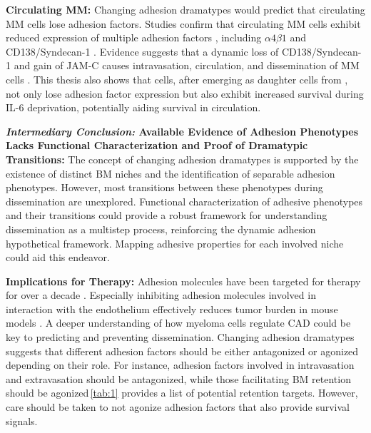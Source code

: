 \textbf{Circulating MM:}
Changing adhesion dramatypes would predict that circulating MM cells lose adhesion
factors. Studies confirm that  circulating
\ac{MM} cells exhibit reduced expression of multiple adhesion factors
, including
$\alpha4\beta1$ and CD138/Syndecan-1
\cite{paivaDetailedCharacterizationMultiple2013,
      paivaCompetitionClonalPlasma2011, akhmetzyanovaDynamicCD138Surface2020}.
Evidence suggests that a dynamic loss of CD138/Syndecan-1 and gain of JAM-C
causes intravasation, circulation, and dissemination of MM cells
\cite{akhmetzyanovaDynamicCD138Surface2020,
      brandlJunctionalAdhesionMolecule2022}. This thesis also shows that \nMAina
cells, after emerging as daughter cells from \MAina, not only lose adhesion
factor expression but also exhibit increased survival during IL-6 deprivation,
potentially aiding survival in circulation.


\textbf{\textit{Intermediary Conclusion:} Available Evidence of Adhesion
      Phenotypes Lacks Functional Characterization and Proof of Dramatypic
      Transitions:} The concept of changing adhesion dramatypes is supported by the
existence of distinct BM niches and the identification of separable adhesion
phenotypes. However, most transitions between these phenotypes during
dissemination are unexplored. Functional characterization of adhesive phenotypes
and their transitions could provide a robust framework for understanding
dissemination as a multistep process, reinforcing the dynamic adhesion
hypothetical framework. Mapping adhesive properties for each involved niche
could aid this endeavor.



\textbf{Implications for Therapy:}
Adhesion molecules have been targeted for therapy for over a decade
\cite{nairChapterSixEmerging2012, neriTargetingAdhesionMolecules2012}.
Especially inhibiting adhesion molecules involved in interaction with the
endothelium effectively reduces tumor burden in mouse models
\cite{asosinghUniquePathwayHoming2001a,
      mrozikTherapeuticTargetingNcadherin2015}. A deeper understanding of how myeloma
cells regulate \ac{CAD} could be key to predicting and preventing
dissemination. Changing adhesion dramatypes suggests that different adhesion factors
should be either antagonized or agonized depending on their role. For instance,
adhesion factors involved in intravasation and extravasation should be
antagonized, while those facilitating BM retention should be
agonized\,\textemdash\autoref{tab:1} provides a list of potential retention
targets. However, care should be taken to not agonize adhesion factors that also
provide survival signals.



